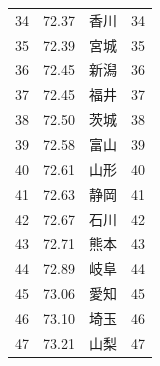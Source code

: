 \begin{table}[ht]
\begin{tabular}{rrlr}
  34 & 72.37 & 香川 &  34 \\
  35 & 72.39 & 宮城 &  35 \\
  36 & 72.45 & 新潟 &  36 \\
  37 & 72.45 & 福井 &  37 \\
  38 & 72.50 & 茨城 &  38 \\
  39 & 72.58 & 富山 &  39 \\
  40 & 72.61 & 山形 &  40 \\
  41 & 72.63 & 静岡 &  41 \\
  42 & 72.67 & 石川 &  42 \\
  43 & 72.71 & 熊本 &  43 \\
  44 & 72.89 & 岐阜 &  44 \\
  45 & 73.06 & 愛知 &  45 \\
  46 & 73.10 & 埼玉 &  46 \\
  47 & 73.21 & 山梨 &  47 \\
   \hline
\end{tabular}
\end{table}








